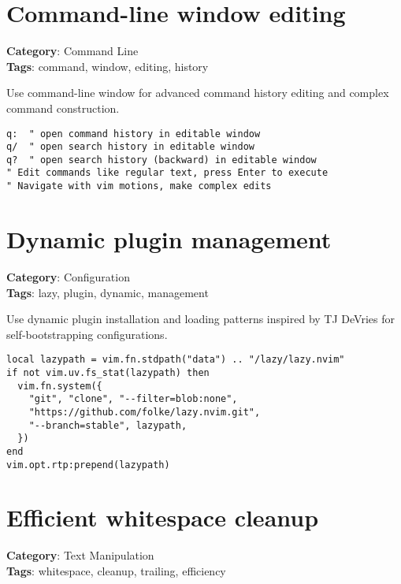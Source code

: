 {{{{\section{Command-line window editing}

\textbf{Category}: Command Line\\ \textbf{Tags}: command, window, editing, history
\vspace{0.5cm}

Use command-line window for advanced command history editing and complex command construction.

\begin{Exa*}{}
\begin{Verbatim}[fontsize=\footnotesize, breaklines, breakanywhere]
q:  " open command history in editable window
q/  " open search history in editable window  
q?  " open search history (backward) in editable window
" Edit commands like regular text, press Enter to execute
" Navigate with vim motions, make complex edits
\end{Verbatim}
\end{Exa*}

\section{Dynamic plugin management}

\textbf{Category}: Configuration\\ \textbf{Tags}: lazy, plugin, dynamic, management
\vspace{0.5cm}

Use dynamic plugin installation and loading patterns inspired by TJ DeVries for self-bootstrapping configurations.

\begin{Exa*}{}
\begin{Verbatim}[fontsize=\footnotesize, breaklines, breakanywhere]
local lazypath = vim.fn.stdpath("data") .. "/lazy/lazy.nvim"
if not vim.uv.fs_stat(lazypath) then
  vim.fn.system({
    "git", "clone", "--filter=blob:none",
    "https://github.com/folke/lazy.nvim.git",
    "--branch=stable", lazypath,
  })
end
vim.opt.rtp:prepend(lazypath)
\end{Verbatim}
\end{Exa*}

\section{Efficient whitespace cleanup}

\textbf{Category}: Text Manipulation\\ \textbf{Tags}: whitespace, cleanup, trailing, efficiency
\vspace{0.5cm}

}}}}
